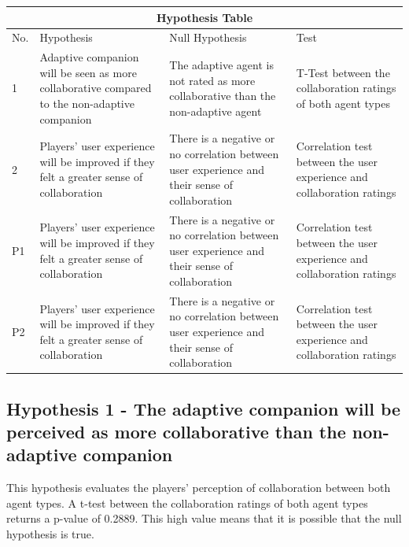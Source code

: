 \documentclass{IEEEtran}
\begin{document}
\begin{tabular}{ |p{0.3cm}|p{2.5cm}|p{2.5cm}|p{1.8cm}|  }
 \hline
 \multicolumn{4}{|c|}{Hypothesis Table} \\
 \hline
 No. & Hypothesis & Null Hypothesis & Test\\
 \hline
    1 & Adaptive companion will be seen as more collaborative compared to the non-adaptive companion & 
    The adaptive agent is not rated as more collaborative than the non-adaptive agent &
    T-Test between the collaboration ratings of both agent types \\
 \hline
    2 & Players' user experience will be improved if they felt a greater sense of collaboration & 
    There is a negative or no correlation between user experience and their sense of collaboration &
    Correlation test between the user experience and collaboration ratings\\
 \hline
    P1 & Players' user experience will be improved if they felt a greater sense of collaboration & 
    There is a negative or no correlation between user experience and their sense of collaboration &
    Correlation test between the user experience and collaboration ratings\\
 \hline
    P2 & Players' user experience will be improved if they felt a greater sense of collaboration & 
    There is a negative or no correlation between user experience and their sense of collaboration &
    Correlation test between the user experience and collaboration ratings\\
 \hline
\end{tabular}

\subsection{Hypothesis 1 - The adaptive companion will be perceived as more collaborative than the non-adaptive companion}

This hypothesis evaluates the players’ perception of collaboration between both agent types. A t-test between the collaboration ratings of both agent types returns a p-value of 0.2889. This high value means that it is possible that the null hypothesis is true.
\end{document}
